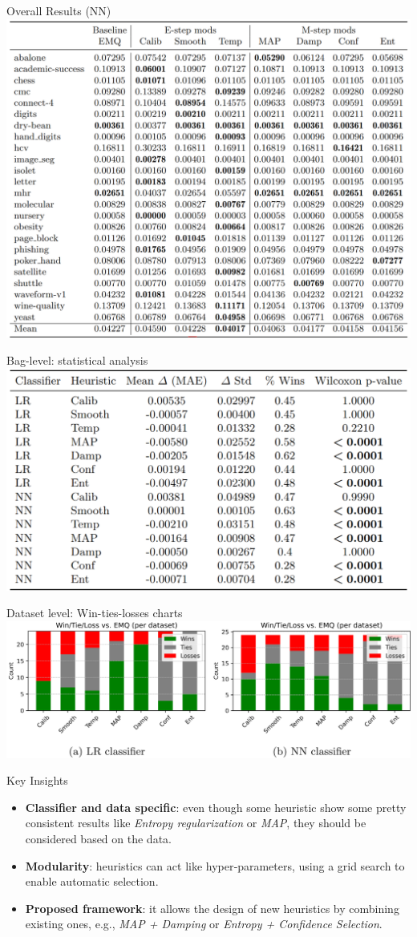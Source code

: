 \documentclass[aspectratio=169]{beamer}
\begin{document}
\begin{frame}{Overall Results (NN)}
  \centering
  \includegraphics[width=0.6\linewidth]{images/results_nn.png}
\end{frame}

\begin{frame}{Bag-level: statistical analysis}
  \centering
  \includegraphics[width=0.6\linewidth]{images/statistical_analysis.png}
\end{frame}

\begin{frame}{Dataset level: Win-ties-losses charts}
  \centering
    \includegraphics[width=0.9\linewidth]{images/datasetlevel.png}

  
\end{frame}

\begin{frame}{Key Insights}
  \begin{itemize}
    \item \textbf{Classifier and data specific}: even though some heuristic show some pretty consistent results like \textit{Entropy regularization} or \textit{MAP}, they should be considered based on the data.
    \item \textbf{Modularity}: heuristics can act like hyper‑parameters, using a grid search to enable automatic selection.
    \item \textbf{Proposed framework}: it allows the design of new heuristics by combining existing ones, e.g., \textit{MAP + Damping} or \textit{Entropy + Confidence Selection}.
  \end{itemize}
\end{frame}
\end{document}
